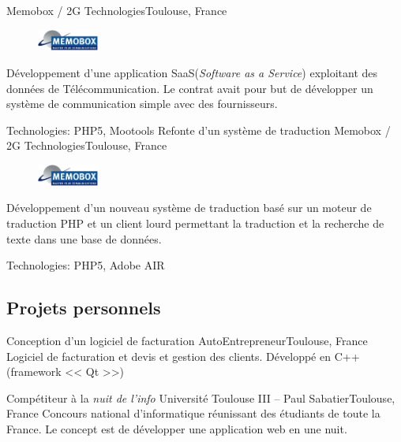 \documentclass{my_cv_bis}
\begin{document}
	{Memobox / 2G Technologies}{Toulouse, France}
	{%
	\begin{minipage}{0.85\textwidth}
	\begin{figure}
		\vspace{-0.5cm}
		\includegraphics[width=2cm]{images/logos/memobox.jpg}
	\end{figure}	
	Développement d'une application SaaS(\textit{Software as a Service}) exploitant des données de Télécommunication. Le contrat
	avait pour but de développer un système de communication simple avec des fournisseurs.
	\end{minipage}
	} {Technologies: PHP5, Mootools}
	\vspace{15px}
	{ Refonte d’un système de traduction }
	{Memobox / 2G Technologies}{Toulouse, France}
	{
	\begin{minipage}{0.85\textwidth}
	\begin{figure}
		\vspace{-0.4cm}
		\includegraphics[width=2cm]{images/logos/memobox.jpg}
	\end{figure}	
	Développement d'un nouveau système de traduction basé sur un moteur de traduction PHP et un client lourd
	permettant la traduction et la recherche de texte dans une base de données.
	\end{minipage}
	} {Technologies: PHP5, Adobe AIR}
	
		\newpage
	\subsection{Projets personnels}
	{Conception d'un logiciel de facturation}
	{AutoEntrepreneur}{Toulouse, France}
	{Logiciel de facturation et devis et gestion des clients. Développé en C++ (framework << Qt >>)
	} 
	{}

	{Compétiteur à la \textit{nuit de l'info}}
	{Université Toulouse III -- Paul Sabatier}{Toulouse, France}
	{ Concours national d’informatique réunissant des étudiants de toute la France. Le concept est de développer une application web en une nuit.} 
	{\vspace{20px}}
\end{document}
